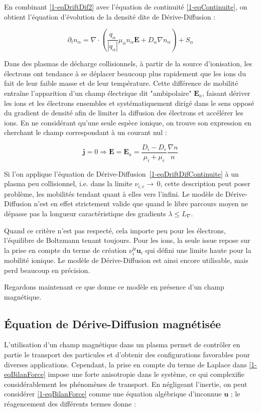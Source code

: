\begin{refsection}
En combinant \eqref{1-eqDriftDif2} avec l'équation de continuité
\eqref{1-eqContinuite}, on obtient l'équation d'évolution de la densité
dite de Dérive-Diffusion :
 
\begin{equation}
\label{1-eqDriftDifContinuite}
\partial_t
n_\alpha=\nabla\cdot({\frac{q_\alpha}{|q_\alpha|}\mu_\alpha n_\alpha\mathbf E}
+{D_\alpha{\nabla n_\alpha}})+S_\alpha
\end{equation}

Dans des plasmas de décharge collisionnels, à partir de la source d'ionisation,
les électrons ont tendance à se déplacer beaucoup plus rapidement que les ions
du fait de leur faible masse et de leur température. Cette différence de
mobilité entraîne l'apparition d'un champ électrique dit "ambipolaire"
$\mathbf E_a$, faisant dériver les ions et les électrons ensembles et
systématiquement dirigé dans le sens opposé du gradient de densité afin de
limiter la diffusion des électrons et accélérer les ions. En ne considérant
qu'une seule espèce ionique, on trouve son expression en cherchant le champ
correspondant à un courant nul :
 
\begin{equation}
\label{1-eqEAmb}
\mathbf j=0 \Rightarrow \mathbf E=\mathbf
E_a=\frac{D_i-D_e}{\mu_i+\mu_e}\frac{\nabla
n}{n}
\end{equation}

Si l'on applique l'équation de
Dérive-Diffusion~\eqref{1-eqDriftDifContinuite} à un plasma peu collisionnel,
i.e. dans la limite $\nu_{i,e}\rightarrow\,$0, cette description peut poser
problème, les mobilités tendant quant à elles vers l'infini. Le modèle de
Dérive-Diffusion n'est en effet strictement valide que quand le libre parcours
moyen ne dépasse pas la longueur caractéristique des gradients $\lambda\le
L_{\nabla}$.

Quand ce critère n'est pas respecté, cela importe peu pour les
électrons, l'équilibre de
Boltzmann tenant toujours.
Pour les ions, la seule issue repose sur la prise en compte du
terme de création $\nu^\text{iz}_i\mathbf u_i$ qui défini une limite haute pour
la mobilité ionique.
Le modèle de Dérive-Diffusion est ainsi encore utilisable, mais perd beaucoup en
précision.

Regardons maintenant ce que donne ce modèle en présence d'un champ magnétique.

\subsection{Équation de Dérive-Diffusion magnétisée}
\label{1-deriveDiffMag}
L'utilisation d'un champ magnétique dans un plasma permet de contrôler en partie
le transport des particules et d'obtenir des configurations favorables pour
diverses applications. Cependant, la prise en compte du terme de Laplace dans
\eqref{1-eqBilanForce} impose une forte anisotropie dans le système, ce qui
complexifie considérablement les phénomènes de transport. En
négligeant l'inertie, on peut considérer \eqref{1-eqBilanForce} comme une
équation algébrique d'inconnue $\mathbf u$ ; le réagencement des différents
termes donne :


\end{refsection}
